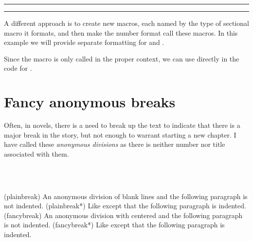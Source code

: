 \fancybreak{$*$}
\fancybreak{}


A different approach is to create new macros, each named by the type
of sectional macro it formats, and then make the number format call
these macros.
In this example we will provide separate formatting for \cmd{\section} and \cmd{\subsection}. 
\begin{lcode}
  \newcommand\sectionsecnumformat{\thesection:\quad} 
  \newcommand\subsectionsecnumformat{\fbox{\enspace\thesubsection\enspace}\enspace}
\end{lcode}
Since the macro is only called in the proper context, we can use
\cmd{\thesection} directly in the code for \cmd{\section}.







\section{Fancy anonymous breaks}

    Often, in novels, there is a need to break up the text to indicate that
there is a major break in the story, but not enough to warrant starting a new
chapter. I have called these 
\emph{anonymous divisions} 
as there is neither number nor title associated with them. 
    
\begin{syntax}
\cmd{\plainbreak} \cmd{\plainbreak*}  \\
\cmd{\fancybreak} \cmd{\fancybreak*}   \\
\end{syntax} 
\glossary(plainbreak)%
  {}%
  {An anonymous division of  blank lines and the following
   paragraph is not indented.}
\glossary(plainbreak*)%
  {}%
  {Like  except that the following paragraph is indented.}
\glossary(fancybreak)%
  {}%
  {An anonymous division with  centered and the following
   paragraph is not indented.}
\glossary(fancybreak*)%
  {}%
  {Like  except that the following paragraph is indented.}

